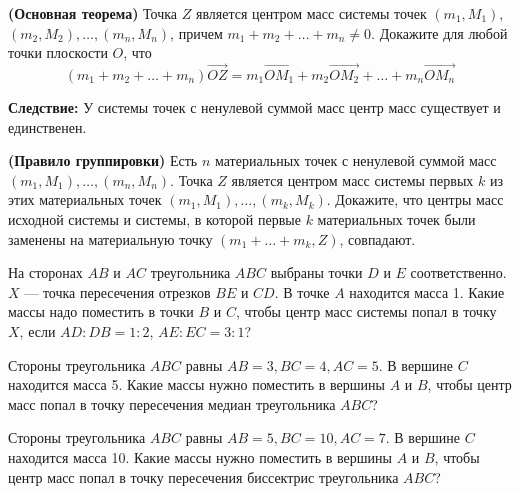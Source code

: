 \documentclass{article}
\begin{document}
    \begin{enumerate_boxed}
        \item \textbf{(Основная теорема)} Точка $Z$ является центром масс системы точек $(m_1,M_1),$ $(m_2,M_2), \dotsc, (m_n,M_n)$, причем $m_1 + m_2 + \dotsc + m_n \neq 0$.
        Докажите для любой точки плоскости $O$, что
        \[
            (m_1 +m_2 + \dotsc + m_n)\overrightarrow{OZ} =m_1\overrightarrow{OM_1} +m_2\overrightarrow{OM_2} +\dotsc +m_n\overrightarrow{OM_n}
        \]

        \textbf{Следствие:} У системы точек с ненулевой суммой масс центр масс существует и единственен.
        \item \textbf{(Правило группировки)} Есть $n$ материальных точек с ненулевой суммой масс $(m_1, M_1), \dotsc , (m_n, M_n)$.
        Точка $Z$ является центром масс системы первых $k$ из этих материальных точек $(m_1, M_1), \dotsc , (m_k, M_k)$.
        Докажите, что центры масс исходной системы и системы, в которой первые $k$ материальных точек были заменены на материальную точку $(m_1 + \dotsc + m_k, Z)$, совпадают.

        \item На сторонах $AB$ и $AC$ треугольника $ABC$ выбраны точки $D$ и $E$ соответственно. $X$ — точка пересечения отрезков $BE$ и $CD$.
        В точке $A$ находится масса 1.
        Какие массы надо поместить в точки $B$ и $C$, чтобы центр масс системы попал в точку $X$, если $AD:DB=1:2$, $AE:EC=3:1$?

        \item Стороны треугольника $ABC$ равны $AB=3, BC = 4, AC = 5$.
        В вершине $C$ находится масса 5.
        Какие массы нужно поместить в вершины $A$ и $B$, чтобы центр масс попал в точку пересечения медиан треугольника $ABC$?

        \item Стороны треугольника $ABC$ равны $AB=5, BC = 10, AC = 7$.
        В вершине $C$ находится масса 10.
        Какие массы нужно поместить в вершины $A$ и $B$, чтобы центр масс попал в точку пересечения биссектрис треугольника $ABC$?


\end{enumerate_boxed}
\end{document}
